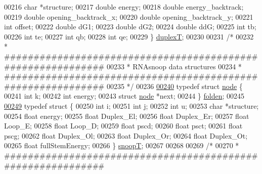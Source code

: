 \begin{DoxyCode}
00216   \textcolor{keywordtype}{char}    *structure;
00217   \textcolor{keywordtype}{double}  energy;
00218   \textcolor{keywordtype}{double}  energy\_backtrack;
00219   \textcolor{keywordtype}{double}  opening\_backtrack\_x;
00220   \textcolor{keywordtype}{double}  opening\_backtrack\_y;
00221   \textcolor{keywordtype}{int}     offset;
00222   \textcolor{keywordtype}{double}  dG1;
00223   \textcolor{keywordtype}{double}  dG2;
00224   \textcolor{keywordtype}{double}  ddG;
00225   \textcolor{keywordtype}{int}     tb;
00226   \textcolor{keywordtype}{int}     te;
00227   \textcolor{keywordtype}{int}     qb;
00228   \textcolor{keywordtype}{int}     qe;
00229 \} \hyperlink{group__data__structures_structduplexT}{duplexT};
00230 
00231 \textcolor{comment}{/*}
00232 \textcolor{comment}{ * ############################################################}
00233 \textcolor{comment}{ * RNAsnoop data structures}
00234 \textcolor{comment}{ * ############################################################}
00235 \textcolor{comment}{ */}
00236 
\hyperlink{group__data__structures}{00240} \textcolor{keyword}{typedef} \textcolor{keyword}{struct }\hyperlink{group__data__structures_structnode}{node} \{
00241   \textcolor{keywordtype}{int}         k;
00242   \textcolor{keywordtype}{int}         energy;
00243   \textcolor{keyword}{struct }\hyperlink{group__data__structures_structnode}{node} *next;
00244 \} \hyperlink{group__data__structures_gaaf402058651c8218fa72788d591cda05}{folden};
00245 
\hyperlink{group__data__structures}{00249} \textcolor{keyword}{typedef} \textcolor{keyword}{struct }\{
00250   \textcolor{keywordtype}{int}   i;
00251   \textcolor{keywordtype}{int}   j;
00252   \textcolor{keywordtype}{int}   u;
00253   \textcolor{keywordtype}{char}  *structure;
00254   \textcolor{keywordtype}{float} energy;
00255   \textcolor{keywordtype}{float} Duplex\_El;
00256   \textcolor{keywordtype}{float} Duplex\_Er;
00257   \textcolor{keywordtype}{float} Loop\_E;
00258   \textcolor{keywordtype}{float} Loop\_D;
00259   \textcolor{keywordtype}{float} pscd;
00260   \textcolor{keywordtype}{float} psct;
00261   \textcolor{keywordtype}{float} pscg;
00262   \textcolor{keywordtype}{float} Duplex\_Ol;
00263   \textcolor{keywordtype}{float} Duplex\_Or;
00264   \textcolor{keywordtype}{float} Duplex\_Ot;
00265   \textcolor{keywordtype}{float} fullStemEnergy;
00266 \} \hyperlink{group__data__structures_structsnoopT}{snoopT};
00267 
00268 
00269 \textcolor{comment}{/*}
00270 \textcolor{comment}{ * ############################################################}

\end{DoxyCode}
